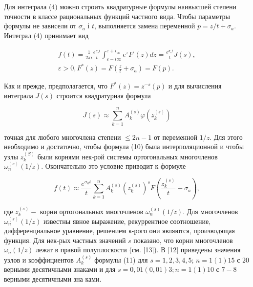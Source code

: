 \documentclass[10pt]{article}
\begin{document}
Для интеграла (4) можно строить квадратурные формулы наивысшей степени точности в классе рациональных функций частного вида. Чтобы параметры формулы не зависели от $\sigma_{a}$ і $t$, выполняется замена переменной $p=z / t+\sigma_{a}$. Интеграл (4) принимает вид



\[

\begin{gathered}

f(t)=\frac{1}{2 \pi i} \frac{e^{\sigma_{a} t}}{t} \int_{\varepsilon-i \infty}^{\varepsilon+i_{\infty}} e^{z} F^{:}(z) d z=\frac{e^{\sigma_{a} t}}{t} J(s), \\

\varepsilon>0, F^{*}(z)=F\left(\frac{z}{t}+\sigma_{a}\right)=F(p) .

\end{gathered}

\]



Как и прежде, предполагается, что $F^{*}(z)=z^{-s}(p)$ и для вычисления интеграла $J(s)$ строится квадратурная формула



\[

J(s) \approx \sum_{k=1}^{n} A_{k}^{(s)} \varphi\left(z_{k}^{(s)}\right)

\]



точная для любого многочлена степени $\leqslant 2 n-1$ от переменной $1 / z$. Для этого необходимо и достаточно, чтобы формула (10) была интерполяционной и чтобы узлы $z_{k}^{(S)}$ были корнями нек-рой системы ортогональных многочленов $\omega_{n}^{(s)}(1 / z)$. Окончательно это условие приводит к формуле



\[

f(t) \approx \frac{e^{\sigma_{a} t}}{t} \sum_{k=1}^{n} A_{k}^{(s)}\left(z_{k}^{(s)}\right)^{s} F\left(\frac{z_{k}^{(s)}}{t}+\sigma_{a}\right),

\]



где $z_{k}^{(s)}-$ корни ортогональных многочленов $\omega_{n}^{(s)}(1 / z)$. Для многочленов $\omega_{n}^{(s)}(1 / z)$ известны явное выражение, рекуррентное соотношение, дифференциальное уравнение, решением к-рого они являются, производящая функция. Для нек-рых частных значений $s$ показано, что корни многочленов $\omega_{n}(1 / z)$ лежат в правой полуплоскости (см. [13]). В [12] приведены значения узлов и коэффициентов $A_{k}^{(s)}$ формулы (11) для $s=1,2,3,4,5$; $n=1(1) 15$ с 20 верными десятичными знаками и для $s=0,01(0,01) 3 ; n=1(1) 10$ с $7-8$ верными десятичными зна ками.
\end{document}
